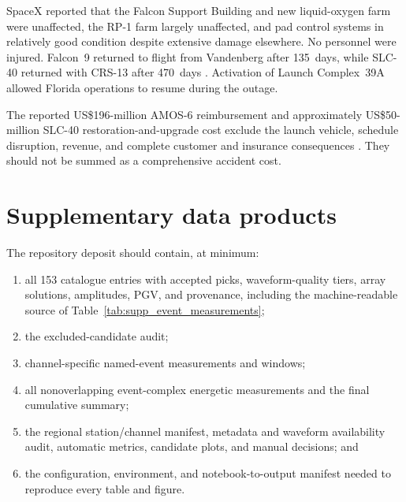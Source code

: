 \documentclass[]{seismica}
\begin{document}
SpaceX reported that the Falcon Support Building and new liquid-oxygen farm
were unaffected, the RP-1 farm largely unaffected, and pad control systems in
relatively good condition despite extensive damage elsewhere. No personnel
were injured. Falcon~9 returned to flight from Vandenberg after 135~days, while
SLC-40 returned with CRS-13 after 470~days
\citep{spacex_iridium1_2017,spacex_crs13_2017}. Activation of Launch
Complex~39A allowed Florida operations to resume during the outage.

The reported US\$196-million AMOS-6 reimbursement and approximately
US\$50-million SLC-40 restoration-and-upgrade cost exclude the launch vehicle,
schedule disruption, revenue, and complete customer and insurance consequences
\citep{magan_amos6_2016,clark_slc40_2017}. They should not be summed as a
comprehensive accident cost.

\section{Supplementary data products}

The repository deposit should contain, at minimum:
\begin{enumerate}
  \item all 153 catalogue entries with accepted picks, waveform-quality tiers,
        array solutions, amplitudes, PGV, and provenance, including the
        machine-readable source of
        Table~\ref{tab:supp_event_measurements};
  \item the excluded-candidate audit;
  \item channel-specific named-event measurements and windows;
  \item all nonoverlapping event-complex energetic measurements and the final
        cumulative summary;
  \item the regional station/channel manifest, metadata and waveform
        availability audit, automatic metrics, candidate plots, and manual
        decisions; and
  \item the configuration, environment, and notebook-to-output manifest needed
        to reproduce every table and figure.
\end{enumerate}


\end{document}

